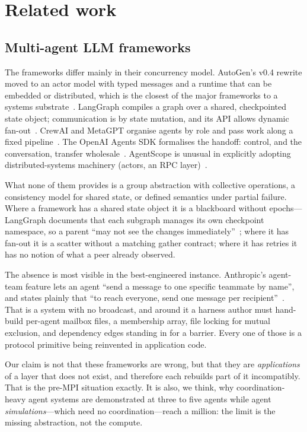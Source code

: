 \section{Related work}
\label{sec:related}

\subsection{Multi-agent LLM frameworks}

The frameworks differ mainly in their concurrency model.
AutoGen's v0.4 rewrite moved to an actor model with typed messages and a
runtime that can be embedded or distributed, which is the closest of the
major frameworks to a systems substrate~\cite{microsoft2025autogen04,autogencoredocs2025}.
LangGraph compiles a graph over a shared, checkpointed state object;
communication is by state mutation, and its  API allows dynamic
fan-out~\cite{langchaindocs2026persistence}. CrewAI and MetaGPT organise agents by role
and pass work along a fixed
pipeline~\cite{crewaidocs2026,hong2024metagpt}. The OpenAI Agents SDK
formalises the handoff: control, and the conversation, transfer
wholesale~\cite{openaiagentsdocs2026handoffs}. AgentScope is unusual in explicitly
adopting distributed-systems machinery (actors, an
RPC layer)~\cite{agentscope2docs2026}.

What none of them provides is a group abstraction with collective
operations, a consistency model for shared state, or defined semantics under
partial failure. Where a framework has a shared state object it is a
blackboard without epochs---LangGraph documents that each subgraph manages
its own checkpoint namespace, so a parent ``may not see the changes
immediately''~\cite{langchaindocs2026persistence}; where it has fan-out it is
a scatter without a matching gather contract; where it has retries it has no
notion of what a peer already observed.

The absence is most visible in the best-engineered instance. Anthropic's
agent-team feature lets an agent ``send a message to one specific teammate by
name'', and states plainly that ``to reach everyone, send one message per
recipient''~\cite{claudecodedocs2026agentteams}. That is a system with no
broadcast, and around it a harness author must hand-build per-agent mailbox
files, a membership array, file locking for mutual exclusion, and dependency
edges standing in for a barrier. Every one of those is a protocol primitive
being reinvented in application code.

Our claim is not that these frameworks are wrong, but that they are
\emph{applications} of a layer that does not exist, and therefore each
rebuilds part of it incompatibly. That is the pre-MPI situation exactly. It
is also, we think, why coordination-heavy agent systems are demonstrated at
three to five agents while agent \emph{simulations}---which need no
coordination---reach a million: the limit is the missing abstraction, not
the compute.

